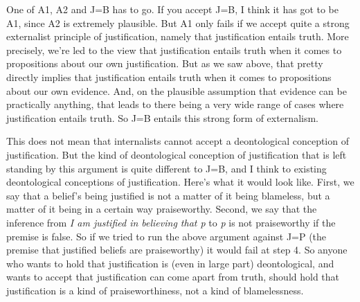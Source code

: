 \noindent One of A1, A2 and J=B has to go. If you accept J=B, I think it has got to be A1, since A2 is extremely plausible. But A1 only fails if we accept quite a strong externalist principle of justification, namely that justification entails truth. More precisely, we're led to the view that justification entails truth when it comes to propositions about our own justification. But as we saw above, that pretty directly implies that justification entails truth when it comes to propositions about our own evidence. And, on the plausible assumption that evidence can be practically anything, that leads to there being a very wide range of cases where justification entails truth. So J=B entails this strong form of externalism.

This does not mean that internalists cannot accept a deontological conception of justification. But the kind of deontological conception of justification that is left standing by this argument is quite different to J=B, and I think to existing deontological conceptions of justification. Here's what it would look like. First, we say that a belief's being justified is not a matter of it being blameless, but a matter of it being in a certain way praiseworthy. Second, we say that the inference from \textit{I am justified in believing that p} to \textit{p} is not praiseworthy if the premise is false. So if we tried to run the above argument against J=P (the premise that justified beliefs are praiseworthy) it would fail at step 4. So anyone who wants to hold that justification is (even in large part) deontological, and wants to accept that justification can come apart from truth, should hold that justification is a kind of praiseworthiness, not a kind of blamelessness.
